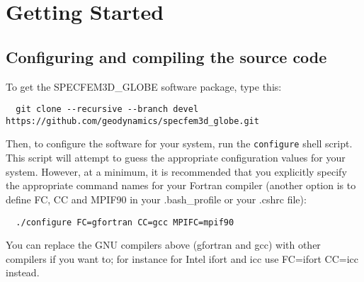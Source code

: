 
\chapter{Getting Started}\label{cha:Getting-Started}



\section{Configuring and compiling the source code}

To get the SPECFEM3D\_GLOBE software package, type this:
{\small
\begin{verbatim}
  git clone --recursive --branch devel https://github.com/geodynamics/specfem3d_globe.git
\end{verbatim}
}
\noindent
Then, to configure the software for your system, run the
\texttt{configure} shell script. This script will attempt to guess
the appropriate configuration values for your system. However, at
a minimum, it is recommended that you explicitly specify the appropriate
command names for your Fortran compiler (another option is to define FC, CC and MPIF90 in your .bash\_profile
or your .cshrc file):
{\small
\begin{verbatim}
  ./configure FC=gfortran CC=gcc MPIFC=mpif90
\end{verbatim}
}
\noindent
You can replace the GNU compilers above (gfortran and gcc) with other compilers if you want to; for instance for Intel ifort and icc use FC=ifort CC=icc instead.\\

